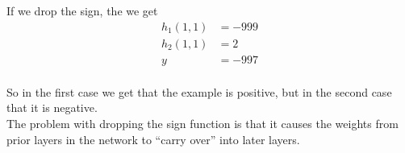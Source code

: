 \documentclass[12pt]{article}
\begin{document}
\begin{enumerate}
    If we drop the sign, the we get
    \begin{equation}
      \begin{split}
        h_1(1, 1)&=-999\\
        h_2(1, 1)&=2\\
        y&=-997\\
      \end{split}
    \end{equation}

    So in the first case we get that the example is positive, but in the second
    case that it is negative.\\
    The problem with dropping the sign function is that it causes the weights
    from prior layers in the network to ``carry over'' into later layers.
\end{enumerate}
\end{document}

